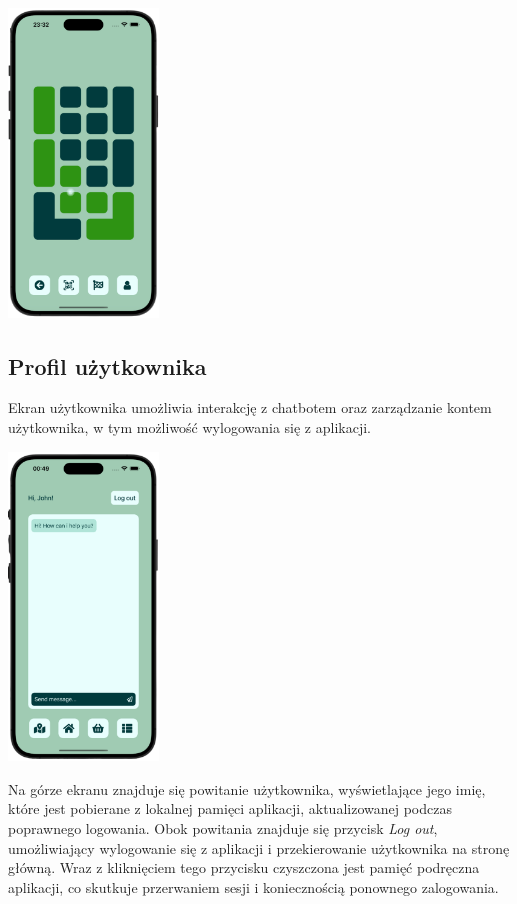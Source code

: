 \begin{center}
    \includegraphics[width=0.3\textwidth]{images/front/navigation_moved.png}
\end{center}

\subsection{Profil użytkownika}

Ekran użytkownika umożliwia interakcję z chatbotem oraz zarządzanie kontem użytkownika, w tym możliwość wylogowania się z aplikacji.

\begin{center}
    \includegraphics[width=0.3\textwidth]{images/front/user_page.png}
\end{center}

Na górze ekranu znajduje się powitanie użytkownika, wyświetlające jego imię, które jest pobierane z lokalnej pamięci aplikacji, aktualizowanej podczas poprawnego logowania. Obok powitania znajduje się przycisk \textit{Log out}, umożliwiający wylogowanie się z aplikacji i przekierowanie użytkownika na stronę główną. Wraz z kliknięciem tego przycisku czyszczona jest pamięć podręczna aplikacji, co skutkuje przerwaniem sesji i koniecznością ponownego zalogowania.

